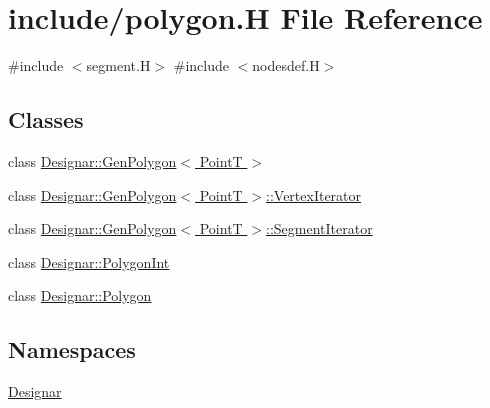 \hypertarget{polygon_8_h}{}\section{include/polygon.H File Reference}
\label{polygon_8_h}
{\ttfamily \#include $<$segment.\+H$>$}\newline
{\ttfamily \#include $<$nodesdef.\+H$>$}\newline
\subsection*{Classes}
\begin{DoxyCompactItemize}
\item 
class \hyperlink{class_designar_1_1_gen_polygon}{Designar\+::\+Gen\+Polygon$<$ Point\+T $>$}
\item 
class \hyperlink{class_designar_1_1_gen_polygon_1_1_vertex_iterator}{Designar\+::\+Gen\+Polygon$<$ Point\+T $>$\+::\+Vertex\+Iterator}
\item 
class \hyperlink{class_designar_1_1_gen_polygon_1_1_segment_iterator}{Designar\+::\+Gen\+Polygon$<$ Point\+T $>$\+::\+Segment\+Iterator}
\item 
class \hyperlink{class_designar_1_1_polygon_int}{Designar\+::\+Polygon\+Int}
\item 
class \hyperlink{class_designar_1_1_polygon}{Designar\+::\+Polygon}
\end{DoxyCompactItemize}
\subsection*{Namespaces}
\begin{DoxyCompactItemize}
\item 
 \hyperlink{namespace_designar}{Designar}
\end{DoxyCompactItemize}
